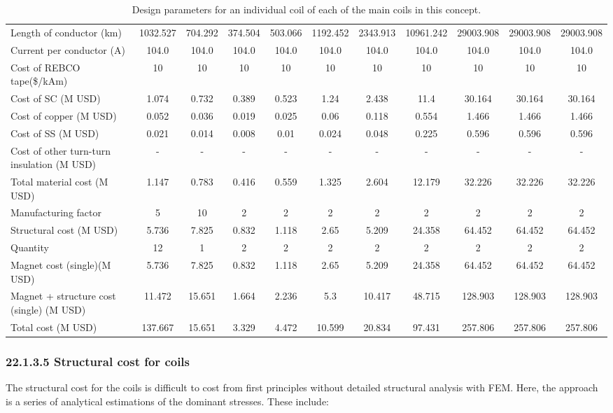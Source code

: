 \begin{table}[h]
{\begin{tabular}{lcccccccccc}
Length of conductor (km) & 1032.527 & 704.292 & 374.504 & 503.066 & 1192.452 & 2343.913 & 10961.242 & 29003.908 & 29003.908 & 29003.908 \\
Current per conductor (A) & 104.0 & 104.0 & 104.0 & 104.0 & 104.0 & 104.0 & 104.0 & 104.0 & 104.0 & 104.0 \\
\hline
Cost of REBCO tape(\$/kAm) & 10 & 10 & 10 & 10 & 10 & 10 & 10 & 10 & 10 & 10 \\
Cost of SC (M USD) & 1.074 & 0.732 & 0.389 & 0.523 & 1.24 & 2.438 & 11.4 & 30.164 & 30.164 & 30.164 \\
Cost of copper (M USD) & 0.052 & 0.036 & 0.019 & 0.025 & 0.06 & 0.118 & 0.554 & 1.466 & 1.466 & 1.466 \\
Cost of SS (M USD) & 0.021 & 0.014 & 0.008 & 0.01 & 0.024 & 0.048 & 0.225 & 0.596 & 0.596 & 0.596 \\
Cost of other turn-turn insulation (M USD) & - & - & - & - & - & - & - & - & - & - \\
Total material cost (M USD) & 1.147 & 0.783 & 0.416 & 0.559 & 1.325 & 2.604 & 12.179 & 32.226 & 32.226 & 32.226 \\
Manufacturing factor & 5 & 10 & 2 & 2 & 2 & 2 & 2 & 2 & 2 & 2 \\
Structural cost (M USD) & 5.736 & 7.825 & 0.832 & 1.118 & 2.65 & 5.209 & 24.358 & 64.452 & 64.452 & 64.452 \\
Quantity & 12 & 1 & 2 & 2 & 2 & 2 & 2 & 2 & 2 & 2 \\
Magnet cost (single)(M USD) & 5.736 & 7.825 & 0.832 & 1.118 & 2.65 & 5.209 & 24.358 & 64.452 & 64.452 & 64.452 \\
Magnet + structure cost (single) (M USD) & 11.472 & 15.651 & 1.664 & 2.236 & 5.3 & 10.417 & 48.715 & 128.903 & 128.903 & 128.903 \\
\hline
Total cost (M USD) & 137.667 & 15.651 & 3.329 & 4.472 & 10.599 & 20.834 & 97.431 & 257.806 & 257.806 & 257.806 \\
\hline
\end{tabular}}
\caption{Design parameters for an individual coil of each of the main coils in this concept.}
\label{your-table-label}
\end{table}


\subsubsection*{22.1.3.5 Structural cost for coils}

The structural cost for the coils is difficult to cost from first principles without detailed structural analysis with FEM. Here, the approach is a series of analytical estimations of the dominant stresses. These include:


